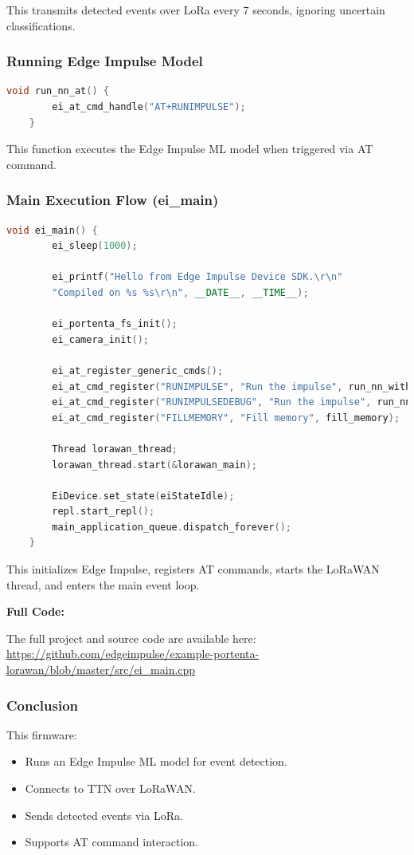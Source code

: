 This transmits detected events over LoRa every 7 seconds, ignoring uncertain classifications.

\subsubsection{Running Edge Impulse Model}

\begin{lstlisting}[language=C++, caption=Executing Edge Impulse Model]
	void run_nn_at() {
		ei_at_cmd_handle("AT+RUNIMPULSE");
	}
\end{lstlisting}

This function executes the Edge Impulse ML model when triggered via AT command.

\subsubsection{Main Execution Flow (ei\_main)}

\begin{lstlisting}[language=C++, caption=Main Execution Function]
	void ei_main() {
		ei_sleep(1000);
		
		ei_printf("Hello from Edge Impulse Device SDK.\r\n"
		"Compiled on %s %s\r\n", __DATE__, __TIME__);
		
		ei_portenta_fs_init();
		ei_camera_init();
		
		ei_at_register_generic_cmds();
		ei_at_cmd_register("RUNIMPULSE", "Run the impulse", run_nn_with_cb);
		ei_at_cmd_register("RUNIMPULSEDEBUG", "Run the impulse", run_nn_debug_with_cb);
		ei_at_cmd_register("FILLMEMORY", "Fill memory", fill_memory);
		
		Thread lorawan_thread;
		lorawan_thread.start(&lorawan_main);
		
		EiDevice.set_state(eiStateIdle);
		repl.start_repl();
		main_application_queue.dispatch_forever();
	}
\end{lstlisting}

This initializes Edge Impulse, registers AT commands, starts the LoRaWAN thread, and enters the main event loop. \cite{edge_impulse_portenta_lorawan:2025}

\textbf{Full Code:}

\begin{code}
	The full project and source code are available here:  
	\url{https://github.com/edgeimpulse/example-portenta-lorawan/blob/master/src/ei_main.cpp}
\end{code}

\subsubsection{Conclusion}

This firmware:
\begin{itemize}
	\item Runs an Edge Impulse ML model for event detection.
	\item Connects to TTN over LoRaWAN.
	\item Sends detected events via LoRa.
	\item Supports AT command interaction. \cite{edge_impulse_portenta_lorawan:2025}
\end{itemize}







